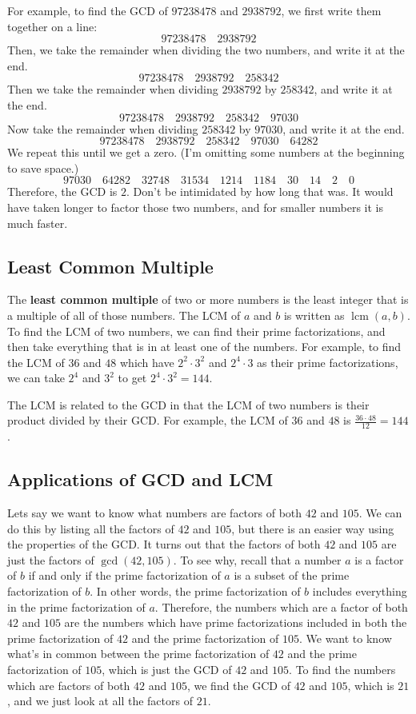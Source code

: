 \documentclass{article}
\DeclareMathOperator{\lcm}{lcm}
\begin{document}
\begin{multicols}{2}
	For example, to find the GCD of $97238478$ and $2938792$, we first write them together on a line:
	\[97238478 \quad 2938792\]
	Then, we take the remainder when dividing the two numbers, and write it at the end.
	\[97238478 \quad 2938792 \quad 258342\]
	Then we take the remainder when dividing $2938792$ by $258342$, and write it at the end.
	\[97238478 \quad 2938792 \quad 258342 \quad 97030\]
	Now take the remainder when dividing $258342$ by $97030$, and write it at the end.
	\[97238478 \quad 2938792 \quad 258342 \quad 97030 \quad 64282\]
	We repeat this until we get a zero.
	(I'm omitting some numbers at the beginning to save space.)
	\[97030 \quad 64282 \quad 32748 \quad 31534 \quad 1214 \quad 1184 \quad 30 \quad 14 \quad 2 \quad 0\]
	Therefore, the GCD is $2$.
	Don't be intimidated by how long that was.
	It would have taken longer to factor those two numbers, and for smaller numbers it is much faster.
	
	\subsection*{Least Common Multiple}
	The \textbf{least common multiple} of two or more numbers is the least integer that is a multiple of all of those numbers.
	The LCM of $a$ and $b$ is written as $\lcm(a, b)$.
	To find the LCM of two numbers, we can find their prime factorizations, and then take everything that is in at least one of the numbers.
	For example, to find the LCM of $36$ and $48$ which have $2^2 \cdot 3^2$ and $2^4 \cdot 3$ as their prime factorizations, we can take $2^4$ and $3^2$ to get $2^4 \cdot 3^2 = 144$.
	
	The LCM is related to the GCD in that the LCM of two numbers is their product divided by their GCD.
	For example, the LCM of $36$ and $48$ is $\frac{36 \cdot 48}{12} = 144$.
	
	\subsection*{Applications of GCD and LCM}
	Lets say we want to know what numbers are factors of both $42$ and $105$.
	We can do this by listing all the factors of $42$ and $105$, but there is an easier way using the properties of the GCD.
	It turns out that the factors of both $42$ and $105$ are just the factors of $\gcd(42, 105)$.
	To see why, recall that a number $a$ is a factor of $b$ if and only if the prime factorization of $a$ is a subset of the prime factorization of $b$.
	In other words, the prime factorization of $b$ includes everything in the prime factorization of $a$.
	Therefore, the numbers which are a factor of both $42$ and $105$ are the numbers which have prime factorizations included in both the prime factorization of $42$ and the prime factorization of $105$.
	We want to know what's in common between the prime factorization of $42$ and the prime factorization of $105$, which is just the GCD of $42$ and $105$.
	To find the numbers which are factors of both $42$ and $105$, we find the GCD of $42$ and $105$, which is $21$, and we just look at all the factors of $21$.


\end{multicols}
\end{document}
